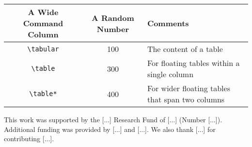\documentclass[sigconf, nonacm]{acmart}
\begin{document}








\begin{table*}[t]
  \caption{A double column table.}
  \label{tab:commands}
  \begin{tabular}{ccl}
    \toprule
    A Wide Command Column & A Random Number & Comments\\
    \midrule
    \verb|\tabular| & 100& The content of a table \\
    \verb|\table|  & 300 & For floating tables within a single column\\
    \verb|\table*| & 400 & For wider floating tables that span two columns\\
    \bottomrule
  \end{tabular}
\end{table*}

\begin{acks}
 This work was supported by the [...] Research Fund of [...] (Number [...]). Additional funding was provided by [...] and [...]. We also thank [...] for contributing [...].
\end{acks}




\end{document}
